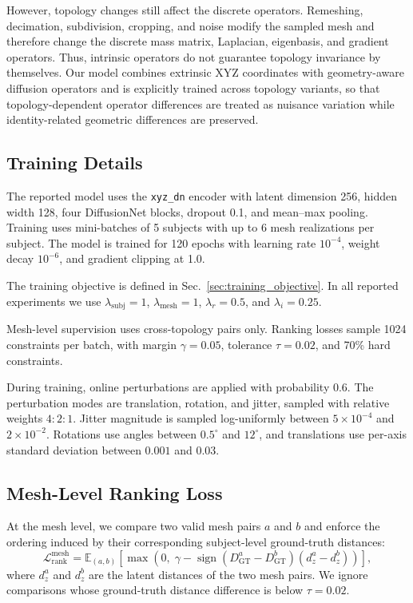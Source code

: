 \documentclass{article}
\begin{document}
However, topology changes still affect the discrete operators. Remeshing,
decimation, subdivision, cropping, and noise modify the sampled mesh and
therefore change the discrete mass matrix, Laplacian, eigenbasis, and gradient
operators. Thus, intrinsic operators do not guarantee topology invariance by
themselves. Our model combines extrinsic XYZ coordinates with geometry-aware
diffusion operators and is explicitly trained across topology variants, so that
topology-dependent operator differences are treated as nuisance variation while
identity-related geometric differences are preserved.

\subsection{Training Details}
\label{app:training_details}

The reported model uses the \texttt{xyz\_dn} encoder with latent dimension 256,
hidden width 128, four DiffusionNet blocks, dropout 0.1, and mean--max pooling.
Training uses mini-batches of 5 subjects with up to 6 mesh realizations per
subject. The model is trained for 120 epochs with learning rate $10^{-4}$,
weight decay $10^{-6}$, and gradient clipping at 1.0.

The training objective is defined in Sec.~\ref{sec:training_objective}. In all
reported experiments we use $\lambda_{\mathrm{subj}}=1$,
$\lambda_{\mathrm{mesh}}=1$, $\lambda_r=0.5$, and $\lambda_i=0.25$.

Mesh-level supervision uses cross-topology pairs only. Ranking losses sample
1024 constraints per batch, with margin $\gamma=0.05$, tolerance $\tau=0.02$,
and 70\% hard constraints.

During training, online perturbations are applied with probability 0.6. The
perturbation modes are translation, rotation, and jitter, sampled with relative
weights $4{:}2{:}1$. Jitter magnitude is sampled log-uniformly between
$5\times10^{-4}$ and $2\times10^{-2}$. Rotations use angles between
$0.5^\circ$ and $12^\circ$, and translations use per-axis standard deviation
between $0.001$ and $0.03$.
\subsection{Mesh-Level Ranking Loss}
\label{app:mesh_level_ranking_loss}

At the mesh level, we compare two valid mesh pairs $a$ and $b$ and enforce the
ordering induced by their corresponding subject-level ground-truth distances:
\begin{equation}
\mathcal L^{\mathrm{mesh}}_{\mathrm{rank}}
=
\mathbb E_{(a,b)}
\left[
\max
\left(
0,\;
\gamma -
\operatorname{sign}
\left(
D_{\mathrm{GT}}^a-D_{\mathrm{GT}}^b
\right)
\left(
d_z^a-d_z^b
\right)
\right)
\right],
\end{equation}
where $d_z^a$ and $d_z^b$ are the latent distances of the two mesh pairs. We
ignore comparisons whose ground-truth distance difference is below $\tau=0.02$.
\end{document}
